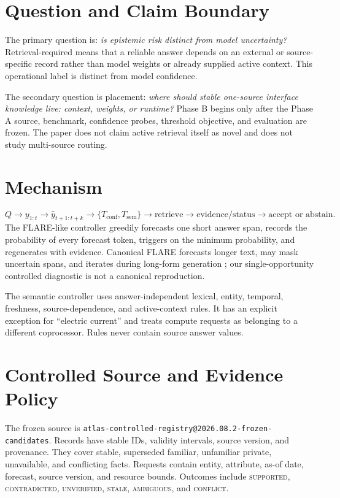 \documentclass[11pt]{article}
\begin{document}
\section{Question and Claim Boundary}
The primary question is: \emph{is epistemic risk distinct from model
uncertainty?} Retrieval-required means that a reliable answer depends on an
external or source-specific record rather than model weights or already supplied
active context. This operational label is distinct from model confidence.

The secondary question is placement: \emph{where should stable one-source
interface knowledge live: context, weights, or runtime?} Phase B begins only
after the Phase A source, benchmark, confidence probes, threshold objective, and
evaluation are frozen. The paper does not claim active retrieval itself as novel
and does not study multi-source routing.

\section{Mechanism}
\[
Q\rightarrow y_{1:t}\rightarrow \widehat{y}_{t+1:t+k}
\rightarrow \{T_{\mathrm{conf}},T_{\mathrm{sem}}\}
\rightarrow \text{retrieve}\rightarrow \text{evidence/status}
\rightarrow \text{accept or abstain}.
\]
The FLARE-like controller greedily forecasts one short answer span, records the
probability of every forecast token, triggers on the minimum probability, and
regenerates with evidence. Canonical FLARE forecasts longer text, may mask
uncertain spans, and iterates during long-form generation \cite{flare}; our
single-opportunity controlled diagnostic is not a canonical reproduction.

The semantic controller uses answer-independent lexical, entity, temporal,
freshness, source-dependence, and active-context rules. It has an explicit
exception for ``electric current'' and treats compute requests as belonging to a
different coprocessor. Rules never contain source answer values.

\section{Controlled Source and Evidence Policy}
The frozen source is
\texttt{atlas-controlled-registry@2026.08.2-frozen-candidates}. Records have
stable IDs, validity intervals, source version, and provenance. They cover
stable, superseded familiar, unfamiliar private, unavailable, and conflicting
facts. Requests contain entity, attribute, as-of date, forecast, source version,
and resource bounds. Outcomes include \textsc{supported},
\textsc{contradicted}, \textsc{unverified}, \textsc{stale},
\textsc{ambiguous}, and \textsc{conflict}.
\end{document}
